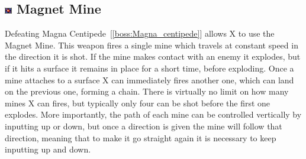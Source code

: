 \subsection{\includegraphics[width=12px, height=10px]{figures/X2/weapons/M_mine.png} Magnet Mine}\label{Magnet_mine}
Defeating Magna Centipede~[\ref{boss:Magna_centipede}] allows X to use the Magnet Mine. This weapon fires a single mine which travels at constant speed in the direction it is shot. If the mine makes contact with an enemy it explodes, but if it hits a surface it remains in place for a short time, before exploding. Once a mine attaches to a surface X can immediately fires another one, which can land on the previous one, forming a chain. There is virtually no limit on how many mines X can fires, but typically only four can be shot before the first one explodes. More importantly, the path of each mine can be controlled vertically by inputting up or down, but once a direction is given the mine will follow that direction, meaning that to make it go straight again it is necessary to keep inputting up and down.
